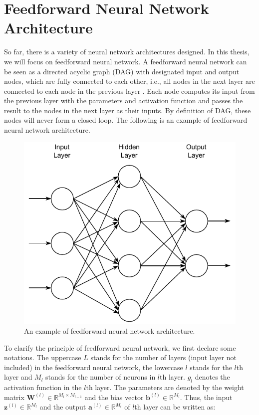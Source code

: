 \documentclass[
	parskip, 			   %
	twoside, 			   %
	DIV=14, 			   %
	BCOR=15.0mm, 		   %
	headsepline, 		   %
	open=right, 		   %
	captions=tableheading, %
	bibliography=totoc,    %
	numbers=noenddot       %
]{scrreprt}
\begin{document}
\section{Feedforward Neural Network Architecture}
So far, there is a variety of neural network architectures designed. In this thesis, we will focus on feedforward neural network. A feedforward neural network can be seen as a directed acyclic graph (DAG) with designated input and output nodes, which are fully connected to each other, i.e., all nodes in the next layer are connected to each node in the previous layer \cite{russell2010artificial}. Each node computes its input from the previous layer with the parameters and activation function and passes the result to the nodes in the next layer as their inputs. By definition of DAG, these nodes will never form a closed loop. The following is an example of feedforward neural network architecture.

\clearpage
\begin{figure}[h!]
    \centering
    \includegraphics[scale=1]{figures/feedforward_neural_network.pdf}
    \caption{An example of feedforward neural network architecture.}
    \label{fig:feedforward}
\end{figure}

To clarify the principle of feedforward neural network, we first declare some notations. The uppercase $L$ stands for the number of layers (input layer not included) in the feedforward neural network, the lowercase $l$ stands for the $l$th layer and $M_{l}$ stands for the number of neurons in $l$th layer. $g_{l}$ denotes the activation function in the $l$th layer. The parameters are denoted by the weight matrix $\mathbf{W}^{(l)} \in \mathbb{R}^{M_{l} \times M_{l-1}}$ and the bias vector $\mathbf{b}^{(l)} \in \mathbb{R}^{M_{l}}$. Thus, the input $\mathbf{z}^{(l)} \in \mathbb{R}^{M_{l}}$ and the output $\mathbf{a}^{(l)} \in \mathbb{R}^{M_{l}}$ of $l$th layer can be written as:
\end{document}
